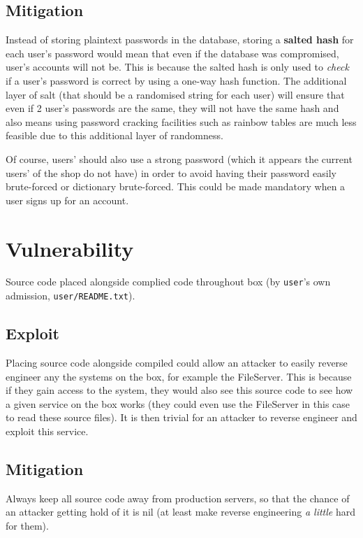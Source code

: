 \documentclass[11pt]{article}
\begin{document}
\subsection{Mitigation}

Instead of storing plaintext passwords in the database, storing a \textbf{salted hash} for each user's password would mean that even if the database was compromised, user's accounts will not be. This is because the salted hash is only used to \textit{check} if a user's password is correct by using a one-way hash function. The additional layer of salt (that should be a randomised string for each user) will ensure that even if 2 user's passwords are the same, they will not have the same hash and also means using password cracking facilities such as rainbow tables are much less feasible due to this additional layer of randomness.

Of course, users' should also use a strong password (which it appears the current users' of the shop do not have) in order to avoid having their password easily brute-forced or dictionary brute-forced. This could be made mandatory when a user signs up for an account.

\section{Vulnerability}

Source code placed alongside complied code throughout box (by \texttt{user}'s own admission, \texttt{user/README.txt}).

\subsection{Exploit}

Placing source code alongside compiled could allow an attacker to easily reverse engineer any the systems on the box, for example the FileServer. This is because if they gain access to the system, they would also see this source code to see how a given service on the box works (they could even use the FileServer in this case to read these source files). It is then trivial for an attacker to reverse engineer and exploit this service.

\subsection{Mitigation}

Always keep all source code away from production servers, so that the chance of an attacker getting hold of it is nil (at least make reverse engineering \textit{a little} hard for them).
\end{document}
